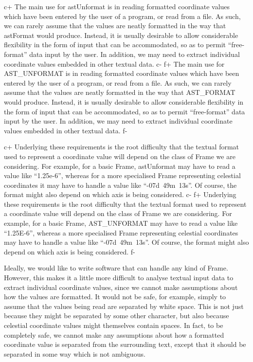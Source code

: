 \documentclass[twoside,11pt]{article}
\begin{document}
c+
The main use for astUnformat is in reading formatted coordinate values
which have been entered by the user of a program, or read from a
file. As such, we can rarely assume that the values are neatly
formatted in the way that astFormat would produce. Instead, it is
usually desirable to allow considerable flexibility in the form of
input that can be accommodated, so as to permit ``free-format'' data
input by the user. In addition, we may need to extract individual
coordinate values embedded in other textual data.
c-
f+
The main use for AST\_UNFORMAT is in reading formatted coordinate
values which have been entered by the user of a program, or read from
a file. As such, we can rarely assume that the values are neatly
formatted in the way that AST\_FORMAT would produce. Instead, it is
usually desirable to allow considerable flexibility in the form of
input that can be accommodated, so as to permit ``free-format'' data
input by the user. In addition, we may need to extract individual
coordinate values embedded in other textual data.
f-

c+
Underlying these requirements is the root difficulty that the textual
format used to represent a coordinate value will depend on the class
of Frame we are considering. For example, for a basic Frame,
astUnformat may have to read a value like ``1.25e-6'', whereas for a
more specialised Frame representing celestial coordinates it may have
to handle a value like ``-07d~49m~13s''. Of course, the format might
also depend on which axis is being considered.
c-
f+
Underlying these requirements is the root difficulty that the textual
format used to represent a coordinate value will depend on the class
of Frame we are considering. For example, for a basic Frame,
AST\_UNFORMAT may have to read a value like ``1.25E-6'', whereas a
more specialised Frame representing celestial coordinates may have to
handle a value like ``-07d~49m~13s''. Of course, the format might also
depend on which axis is being considered.
f-

Ideally, we would like to write software that can handle any kind of
Frame. However, this makes it a little more difficult to analyse
textual input data to extract individual coordinate values, since we
cannot make assumptions about how the values are formatted. It would
not be safe, for example, simply to assume that the values being read
are separated by white space. This is not just because they might be
separated by some other character, but also because celestial
coordinate values might themselves contain spaces. In fact, to be
completely safe, we cannot make any assumptions about how a formatted
coordinate value is separated from the surrounding text, except that
it should be separated in some way which is not ambiguous.
\end{document}
